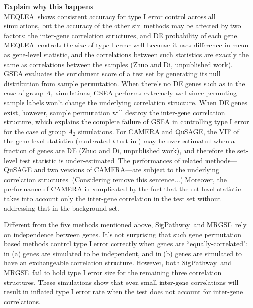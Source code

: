 \documentclass[a4,center,fleqn]{NAR}
\newcommand{\OurMethod}{MEQLEA}
\newcommand{\HowmanyTest}{six}
\newcommand{\aaCase}{a}
\newcommand{\aCase}{c}
\newcommand{\cCase}{b}
\newcommand{\eCase}{d}
\newcommand{\fCase}{e}
\newcommand{\gent}{SigPathway}
\newcommand{\gen}{geneSetTest}
\newcommand{\genr}{MRGSE}
\newcommand{\thepapertobefinished}{Zhuo and Di, unpublished work}
\begin{document}
	\textbf{Explain why this happens}\\
	\OurMethod~shows consistent accuracy for type I error control across all simulations, but the
	accuracy of the other \HowmanyTest~methods may be affected by two factors: the inter-gene
	correlation structures, and DE probability of each gene. \OurMethod~controls the size of type I
	error well because it uses difference in mean as gene-level statistic, and the correlations between
	such statistics are exactly the same as correlations between the samples (\thepapertobefinished).
	 GSEA evaluates the enrichment score
	of a test set by generating its null distribution from sample permutation. When there's no DE genes
	such as in the case of group $A_1$ simulations, GSEA performs extremely well since permuting sample
	labels won't change the underlying correlation structure. When DE genes exist, however, sample
	permutation will destroy the inter-gene correlation structure, which explains the complete failure
	of GSEA in controlling type I error for the case of group $A_2$ simulations. For CAMERA and QuSAGE,
	the VIF of the gene-level statistics (moderated $t$-test in \cite{wu2012camera}) may be
	over-estimated when a fraction of genes are DE (\thepapertobefinished), and therefore the set-level
	test statistic is under-estimated. The performances of related methods---QuSAGE and two versions of
	CAMERA---are subject to the underlying correlation structures. (Considering remove this sentence...)
	Moreover, the performance of CAMERA is complicated by the fact that the set-level statistic takes
	into account only the inter-gene correlation in the test set without addressing that in the
	background set.
	
	Different from the five methods mentioned above, \gent~and \genr~rely on independence between
	genes. It's not surprising that such gene permutation based methods control type I
	error correctly when genes are ``equally-correlated": in (\aaCase) genes are simulated to be
	independent, and in (\cCase) genes are simulated to have an exchangeable correlation structure.
	However, both \gent~and \genr~fail to hold type I error size for the remaining three correlation
	structures. These simulations show that even small inter-gene correlations will result in inflated
	type I error rate when the test does not account for inter-gene correlations.  
	
	
\end{document}

